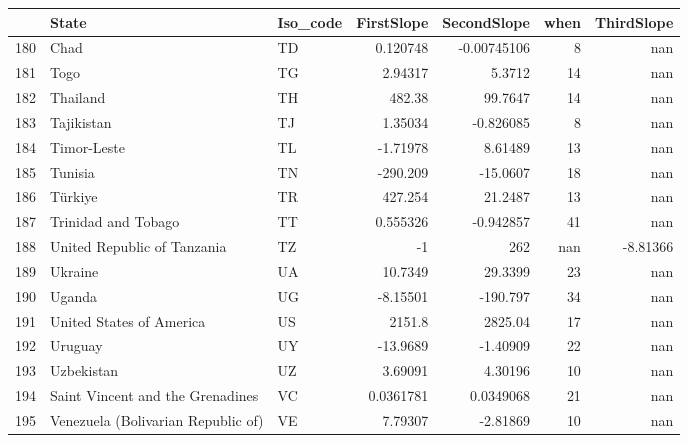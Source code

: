 \begin{tabular}{rllrrrr}
\hline
     & State                              & Iso\_code   &    FirstSlope &   SecondSlope &   when &   ThirdSlope \\
\hline
 180 & Chad                               & TD         &    0.120748   &   -0.00745106 &      8 &    nan       \\
 181 & Togo                               & TG         &    2.94317    &    5.3712     &     14 &    nan       \\
 182 & Thailand                           & TH         &  482.38       &   99.7647     &     14 &    nan       \\
 183 & Tajikistan                         & TJ         &    1.35034    &   -0.826085   &      8 &    nan       \\
 184 & Timor-Leste                        & TL         &   -1.71978    &    8.61489    &     13 &    nan       \\
 185 & Tunisia                            & TN         & -290.209      &  -15.0607     &     18 &    nan       \\
 186 & Türkiye                            & TR         &  427.254      &   21.2487     &     13 &    nan       \\
 187 & Trinidad and Tobago                & TT         &    0.555326   &   -0.942857   &     41 &    nan       \\
 188 & United Republic of Tanzania        & TZ         &   -1          &  262          &    nan &     -8.81366 \\
 189 & Ukraine                            & UA         &   10.7349     &   29.3399     &     23 &    nan       \\
 190 & Uganda                             & UG         &   -8.15501    & -190.797      &     34 &    nan       \\
 191 & United States of America           & US         & 2151.8        & 2825.04       &     17 &    nan       \\
 192 & Uruguay                            & UY         &  -13.9689     &   -1.40909    &     22 &    nan       \\
 193 & Uzbekistan                         & UZ         &    3.69091    &    4.30196    &     10 &    nan       \\
 194 & Saint Vincent and the Grenadines   & VC         &    0.0361781  &    0.0349068  &     21 &    nan       \\
 195 & Venezuela (Bolivarian Republic of) & VE         &    7.79307    &   -2.81869    &     10 &    nan       \\

\end{tabular}

